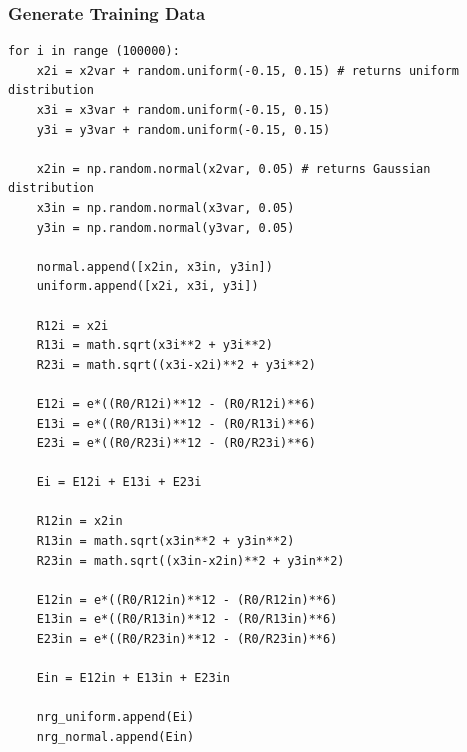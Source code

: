 \documentclass[12pt,a4paper]{article}
\begin{document}
\subsubsection{Generate Training Data} \label{code:data}
\begin{lstlisting}
for i in range (100000):
    x2i = x2var + random.uniform(-0.15, 0.15) # returns uniform distribution
    x3i = x3var + random.uniform(-0.15, 0.15)
    y3i = y3var + random.uniform(-0.15, 0.15)
    
    x2in = np.random.normal(x2var, 0.05) # returns Gaussian distribution
    x3in = np.random.normal(x3var, 0.05)
    y3in = np.random.normal(y3var, 0.05)
    
    normal.append([x2in, x3in, y3in])
    uniform.append([x2i, x3i, y3i])
    
    R12i = x2i
    R13i = math.sqrt(x3i**2 + y3i**2)
    R23i = math.sqrt((x3i-x2i)**2 + y3i**2)
    
    E12i = e*((R0/R12i)**12 - (R0/R12i)**6)
    E13i = e*((R0/R13i)**12 - (R0/R13i)**6)
    E23i = e*((R0/R23i)**12 - (R0/R23i)**6)

    Ei = E12i + E13i + E23i
    
    R12in = x2in
    R13in = math.sqrt(x3in**2 + y3in**2)
    R23in = math.sqrt((x3in-x2in)**2 + y3in**2)
     
    E12in = e*((R0/R12in)**12 - (R0/R12in)**6)
    E13in = e*((R0/R13in)**12 - (R0/R13in)**6)
    E23in = e*((R0/R23in)**12 - (R0/R23in)**6)

    Ein = E12in + E13in + E23in
     
    nrg_uniform.append(Ei)
    nrg_normal.append(Ein)
\end{lstlisting}
\end{document}
